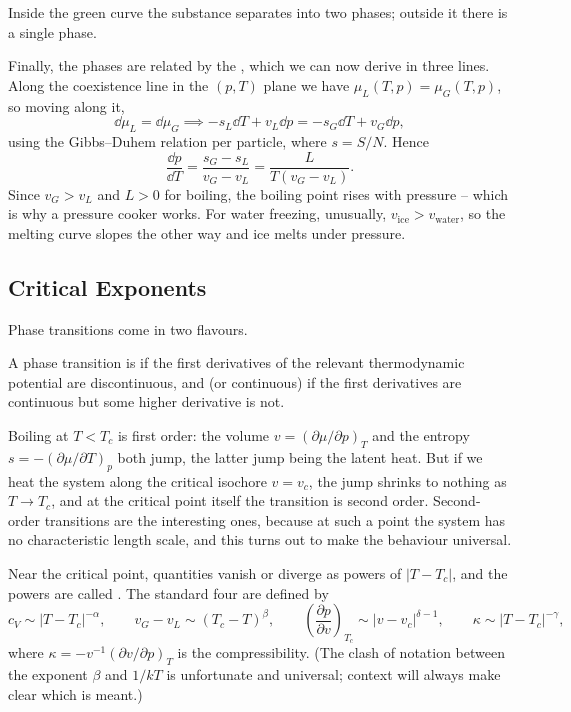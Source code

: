 \documentclass[a4paper]{scrartcl}
\begin{document}
Inside the green curve the substance separates into two phases; outside it there is a single phase.

Finally, the phases are related by the , which we can now derive in three lines. Along the coexistence line in the $(p,T)$ plane we have $\mu_L(T,p) = \mu_G(T,p)$, so moving along it,
$$
\dd \mu_L = \dd\mu_G \implies -s_L\dd T + v_L \dd p = -s_G\dd T + v_G\dd p,
$$
using the Gibbs--Duhem relation per particle, where $s = S/N$. Hence
$$
\frac{\dd p}{\dd T} = \frac{s_G - s_L}{v_G - v_L} = \frac{L}{T(v_G-v_L)}.
$$
Since $v_G > v_L$ and $L > 0$ for boiling, the boiling point rises with pressure -- which is why a pressure cooker works. For water freezing, unusually, $v_{\mathrm{ice}} > v_{\mathrm{water}}$, so the melting curve slopes the other way and ice melts under pressure.

\subsection{Critical Exponents}\label{sec:critexp}

Phase transitions come in two flavours.

\begin{definition}
	A phase transition is  if the first derivatives of the relevant thermodynamic potential are discontinuous, and  (or continuous) if the first derivatives are continuous but some higher derivative is not.
\end{definition}

Boiling at $T < T_c$ is first order: the volume $v = (\partial\mu/\partial p)_T$ and the entropy $s = -(\partial\mu/\partial T)_p$ both jump, the latter jump being the latent heat. But if we heat the system along the critical isochore $v = v_c$, the jump shrinks to nothing as $T \to T_c$, and at the critical point itself the transition is second order. Second-order transitions are the interesting ones, because at such a point the system has no characteristic length scale, and this turns out to make the behaviour universal.

Near the critical point, quantities vanish or diverge as powers of $|T - T_c|$, and the powers are called . The standard four are defined by
$$
c_V \sim |T - T_c|^{-\alpha}, \qquad v_G - v_L \sim (T_c - T)^{\beta}, \qquad \left(\frac{\partial p}{\partial v}\right)_{T_c} \sim |v-v_c|^{\delta - 1}, \qquad \kappa \sim |T-T_c|^{-\gamma},
$$
where $\kappa = -v^{-1}(\partial v/\partial p)_T$ is the compressibility. (The clash of notation between the exponent $\beta$ and $1/kT$ is unfortunate and universal; context will always make clear which is meant.)
\end{document}
